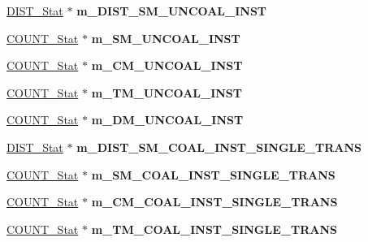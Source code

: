 \begin{DoxyCompactItemize}
\item 
\hypertarget{classall__stats__c_aec1acd21b89d61534296ae100733121f}{
\hyperlink{classDIST__Stat}{DIST\_\-Stat} $\ast$ {\bfseries m\_\-DIST\_\-SM\_\-UNCOAL\_\-INST}}
\label{classall__stats__c_aec1acd21b89d61534296ae100733121f}

\item 
\hypertarget{classall__stats__c_a9adb49b1670295e4cf0226455874a0be}{
\hyperlink{classCOUNT__Stat}{COUNT\_\-Stat} $\ast$ {\bfseries m\_\-SM\_\-UNCOAL\_\-INST}}
\label{classall__stats__c_a9adb49b1670295e4cf0226455874a0be}

\item 
\hypertarget{classall__stats__c_a1d96334e992f0eb9f6fc34457113b1fc}{
\hyperlink{classCOUNT__Stat}{COUNT\_\-Stat} $\ast$ {\bfseries m\_\-CM\_\-UNCOAL\_\-INST}}
\label{classall__stats__c_a1d96334e992f0eb9f6fc34457113b1fc}

\item 
\hypertarget{classall__stats__c_a92098a5a0912fbb0aa055243aeabb8af}{
\hyperlink{classCOUNT__Stat}{COUNT\_\-Stat} $\ast$ {\bfseries m\_\-TM\_\-UNCOAL\_\-INST}}
\label{classall__stats__c_a92098a5a0912fbb0aa055243aeabb8af}

\item 
\hypertarget{classall__stats__c_aee775d7d1e709933786a88bfa289cc8e}{
\hyperlink{classCOUNT__Stat}{COUNT\_\-Stat} $\ast$ {\bfseries m\_\-DM\_\-UNCOAL\_\-INST}}
\label{classall__stats__c_aee775d7d1e709933786a88bfa289cc8e}

\item 
\hypertarget{classall__stats__c_a1128f99458d9249d9db3165a51035228}{
\hyperlink{classDIST__Stat}{DIST\_\-Stat} $\ast$ {\bfseries m\_\-DIST\_\-SM\_\-COAL\_\-INST\_\-SINGLE\_\-TRANS}}
\label{classall__stats__c_a1128f99458d9249d9db3165a51035228}

\item 
\hypertarget{classall__stats__c_ae2c4a050ff6ed93706c52a0edd5bfe7b}{
\hyperlink{classCOUNT__Stat}{COUNT\_\-Stat} $\ast$ {\bfseries m\_\-SM\_\-COAL\_\-INST\_\-SINGLE\_\-TRANS}}
\label{classall__stats__c_ae2c4a050ff6ed93706c52a0edd5bfe7b}

\item 
\hypertarget{classall__stats__c_a2adbdafb98d2cb5877cdec1b37994305}{
\hyperlink{classCOUNT__Stat}{COUNT\_\-Stat} $\ast$ {\bfseries m\_\-CM\_\-COAL\_\-INST\_\-SINGLE\_\-TRANS}}
\label{classall__stats__c_a2adbdafb98d2cb5877cdec1b37994305}

\item 
\hypertarget{classall__stats__c_ac618059a69ef1b4af6e797338da54179}{
\hyperlink{classCOUNT__Stat}{COUNT\_\-Stat} $\ast$ {\bfseries m\_\-TM\_\-COAL\_\-INST\_\-SINGLE\_\-TRANS}}
\label{classall__stats__c_ac618059a69ef1b4af6e797338da54179}


\end{DoxyCompactItemize}
